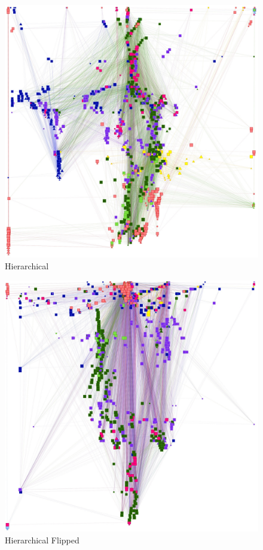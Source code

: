 \begin{figure}[p]
\centering
\includegraphics[height=0.45\textheight]{img/oot/hierarchical}
\caption{Hierarchical}\label{fig:oot:hier}
\end{figure}

\begin{figure}[p]
\centering
\includegraphics[height=0.45\textheight]{img/oot/hierarchical_flipped}
\caption{Hierarchical Flipped}\label{fig:oot:hierflip}
\end{figure}

